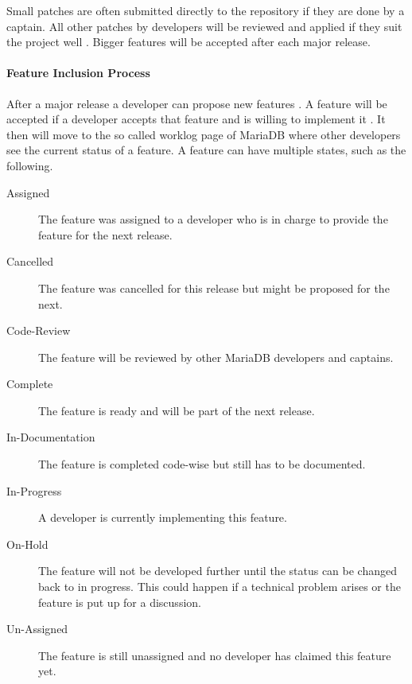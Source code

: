 Small patches are often submitted directly to the repository if they are done
by a captain. All other patches by developers will be reviewed and applied if
they suit the project well \cite{MySQLRoadmap,MySQLPlans}. Bigger features will
be accepted after each major release.

\paragraph{Feature Inclusion Process}

After a major release a developer can propose new features \cite{MySQLPlans}. A
feature will be accepted if a developer accepts that feature and is willing to
implement it \cite{MySQLContributingCode,MySQLContributing}. It then will move
to the so called worklog page of MariaDB where other developers see the current
status of a feature. A feature can have multiple states, such as the following.

\begin{description}

  \item[Assigned] The feature was assigned to a developer who is in
    charge to provide the feature for the next release.

  \item[Cancelled] The feature was cancelled for this release but might
    be proposed for the next.

  \item[Code-Review] The feature will be reviewed by other MariaDB
    developers and captains.

  \item[Complete] The feature is ready and will be part of the next
    release.

  \item[In-Documentation] The feature is completed code-wise but still
    has to be documented.

  \item[In-Progress] A developer is currently implementing this feature.

  \item[On-Hold] The feature will not be developed further until the
    status can be changed back to in progress. This could happen if a
    technical problem arises or the feature is put up for a discussion.

  \item[Un-Assigned] The feature is still unassigned and no developer has
    claimed this feature yet.

\end{description}

